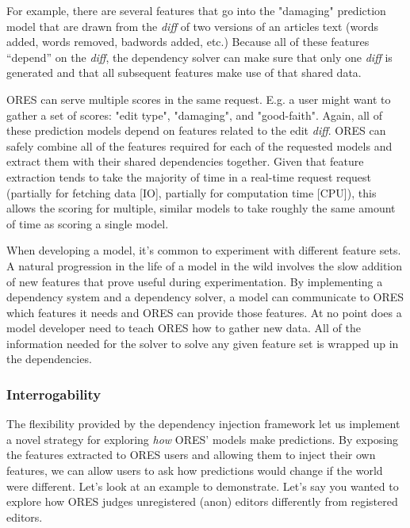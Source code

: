 For example, there are several features that go into the "damaging" prediction model that are drawn from the \emph{diff} of two versions of an articles text (words added, words removed, badwords added, etc.)  Because all of these features ``depend'' on the \emph{diff}, the dependency solver can make sure that only one \emph{diff} is generated and that all subsequent features make use of that shared data.

ORES can serve multiple scores in the same request.  E.g. a user might want to gather a set of scores: "edit type", "damaging", and "good-faith".  Again, all of these prediction models depend on features related to the edit \emph{diff}.  ORES can safely combine all of the features required for each of the requested models and extract them with their shared dependencies together.  Given that feature extraction tends to take the majority of time in a real-time request request (partially for fetching data [IO], partially for computation time [CPU]), this allows the scoring for multiple, similar models to take roughly the same amount of time as scoring a single model.

 When developing a model, it's common to experiment with different feature sets.  A natural progression in the life of a model in the wild involves the slow addition of new features that prove useful during experimentation.  By implementing a dependency system and a dependency solver, a model can communicate to ORES which features it needs and ORES can provide those features.  At no point does a model developer need to teach ORES how to gather new data.  All of the information needed for the solver to solve any given feature set is wrapped up in the dependencies.

\subsubsection{Interrogability}
The flexibility provided by the dependency injection framework let us implement a novel strategy for exploring \emph{how} ORES' models make predictions.  By exposing the features extracted to ORES users and allowing them to inject their own features, we can allow users to ask how predictions would change if the world were different.  Let's look at an example to demonstrate.  Let's say you wanted to explore how ORES judges unregistered (anon) editors differently from registered editors.


